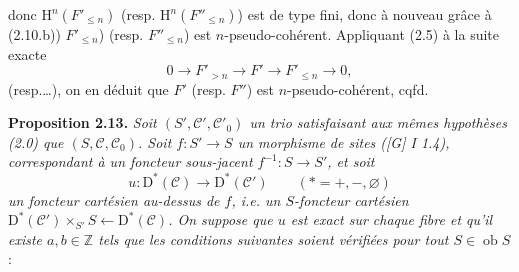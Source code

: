 \documentclass[11pt]{article}
\newcommand{\Spec}{\operatorname{Spec}}
\newcommand{\RRR}{\mathrm{RRR}}
\providecommand{\cC}{\mathcal C}
\providecommand{\Coker}{\operatorname{Coker}}
\providecommand{\Ker}{\operatorname{Ker}}
\providecommand{\cO}{\mathcal O}
\begin{document}
\providecommand{\cS}{\mathcal S}
\providecommand{\cD}{\mathcal D}
\providecommand{\cE}{\mathscr E}
\providecommand{\cG}{\mathscr G}
\providecommand{\cL}{\mathscr L}
\providecommand{\cM}{\mathscr M}
\providecommand{\cP}{\mathscr P}
\providecommand{\cK}{\mathcal K}
\providecommand{\Db}{\mathrm D}
\providecommand{\Kb}{\mathrm K}
\providecommand{\Trc}{\operatorname{Tr}}
\providecommand{\ob}{\operatorname{ob}}
\providecommand{\Coh}{\operatorname{Coh}}
\providecommand{\Cone}{\operatorname{Cone}}
\providecommand{\im}{\operatorname{Im}}
\providecommand{\Id}{\operatorname{Id}}
\providecommand{\RR}{\mathrm{R.R.}}
\providecommand{\RRR}{\mathrm{R.R.R.}}
\providecommand{\GrR}{\mathrm{G}}
\providecommand{\pr}{\operatorname{pr}}
\providecommand{\cC}{\mathcal C}
\providecommand{\cD}{\mathcal D}
\providecommand{\cK}{\mathcal K}
\providecommand{\cO}{\mathcal O}
\providecommand{\cS}{\mathcal S}
\providecommand{\Cpx}{\mathrm C}
\providecommand{\Kpx}{\mathrm K}
\providecommand{\Dpx}{\mathrm D}
\providecommand{\D}{\mathrm D}
\providecommand{\Ho}{\mathrm H}
\providecommand{\RHom}{\mathrm R\!\operatorname{Hom}}
\providecommand{\Ob}{\operatorname{ob}}
\providecommand{\Coker}{\operatorname{Coker}}
\providecommand{\Ker}{\operatorname{Ker}}
\renewcommand{\Im}{\operatorname{Im}}
\providecommand{\Hom}{\operatorname{Hom}}
\providecommand{\Cone}{\operatorname{Cone}}
\providecommand{\id}{\operatorname{Id}}
\providecommand{\qis}{\xrightarrow{\sim}}
\providecommand{\RHom}{\mathrm R\!\Hom}
\providecommand{\Ext}{\operatorname{Ext}}
\providecommand{\coh}{\operatorname{coh}}
\providecommand{\PreCoh}{\operatorname{precoh}}
\providecommand{\Tr}{\operatorname{Tr}}
\providecommand{\Qis}{\operatorname{Qis}}
\providecommand{\Rad}{\operatorname{rad}}
\providecommand{\Spec}{\operatorname{Spec}}
\providecommand{\End}{\operatorname{End}}
\providecommand{\Id}{\operatorname{Id}}
\providecommand{\varinjlim}{\mathop{\mathrm{lim}}\limits_{\longrightarrow}}
\providecommand{\varprojlim}{\mathop{\mathrm{lim}}\limits_{\longleftarrow}}
\providecommand{\qcoh}{\operatorname{qcoh}}
\providecommand{\amp}{\operatorname{amp}}
donc \(\Ho^n(F'_{\leq n})\) (resp. \(\Ho^n(F''_{\leq n})\)) est de type fini, donc à nouveau grâce à (2.10.b)) \(F'_{\leq n}\)) (resp. \(F''_{\leq n}\)) est \(n\)-pseudo-cohérent. Appliquant (2.5) à la suite exacte
\[
  0\longrightarrow F'_{>n}\longrightarrow F'\longrightarrow F'_{\leq n}\longrightarrow 0,
\]
(resp.\dots), on en déduit que \(F'\) (resp. \(F''\)) est \(n\)-pseudo-cohérent, cqfd.

\textbf{Proposition 2.13.} \emph{Soit \((S',\mathcal C',\mathcal C'_0)\) un trio satisfaisant aux mêmes hypothèses (2.0) que \((S,\mathcal C,\mathcal C_0)\). Soit \(f:S'\to S\) un morphisme de sites ([G] I 1.4), correspondant à un foncteur sous-jacent \(f^{-1}:S\to S'\), et soit}
\[
  u:\Dpx^*(\mathcal C)\longrightarrow \Dpx^*(\mathcal C')\qquad (*=+,-,\varnothing)
\]
\emph{un foncteur cartésien au-dessus de \(f\), i.e. un \(S\)-foncteur cartésien \(\Dpx^*(\mathcal C')\times_{S'}S\longleftarrow\Dpx^*(\mathcal C)\). On suppose que \(u\) est exact sur chaque fibre et qu'il existe \(a,b\in\mathbb Z\) tels que les conditions suivantes soient vérifiées pour tout \(S\in\Ob S\)} :
\end{document}
